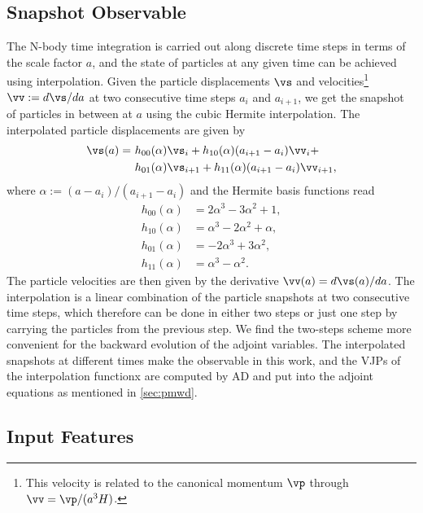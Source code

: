 \documentclass[modern, trackchanges, dvipsnames]{aastex631}
\renewcommand{\d}{d}
\begin{document}
\vspace{1em}
\subsection{Snapshot Observable}
\label{sec:snapobs}

The N-body time integration is carried out along discrete time steps in
terms of the scale factor $a$, and the state of particles at any given
time can be achieved using interpolation.
Given the particle displacements $\vs$ and velocities\footnote{This
velocity is related to the canonical momentum $\vp$ through $\vv =
\vp/(a^3H)$.} $\vv := \d\vs/\d a$ at two consecutive time steps $a_i$ and
$a_{i+1}$, we get the snapshot of particles in between at $a$ using the
cubic Hermite interpolation.
The interpolated particle displacements are given by
\begin{align}
  \vs(a) =\ &h_{00}(\alpha)\vs_i + h_{10}(\alpha)(a_{i+1} - a_i)\vv_i + \nonumber\\
           &h_{01}(\alpha)\vs_{i+1} + h_{11}(\alpha)(a_{i+1} - a_i)\vv_{i+1},
\end{align}
where $\alpha := (a - a_i)/(a_{i+1} - a_i)$ and the Hermite basis
functions read
\begin{align}
  h_{00}(\alpha) &= 2\alpha^3 - 3\alpha^2 + 1, \nonumber\\
  h_{10}(\alpha) &= \alpha^3 - 2\alpha^2 + \alpha, \nonumber\\
  h_{01}(\alpha) &= -2\alpha^3 + 3\alpha^2, \nonumber\\
  h_{11}(\alpha) &= \alpha^3 - \alpha^2.
\end{align}
The particle velocities are then given by the derivative $\vv(a) =
\d\vs(a) / \d a$.
The interpolation is a linear combination of the particle snapshots at
two consecutive time steps, which therefore can be done in either two
steps or just one step by carrying the particles from the previous step.
We find the two-steps scheme more convenient for the backward evolution
of the adjoint variables.
The interpolated snapshots at different times make the observable in
this work, and the VJPs of the interpolation functionx are computed by
AD and put into the adjoint equations as mentioned in
\autoref{sec:pmwd}.


\vspace{1em}
\subsection{Input Features}
\label{sec:features}
\end{document}
